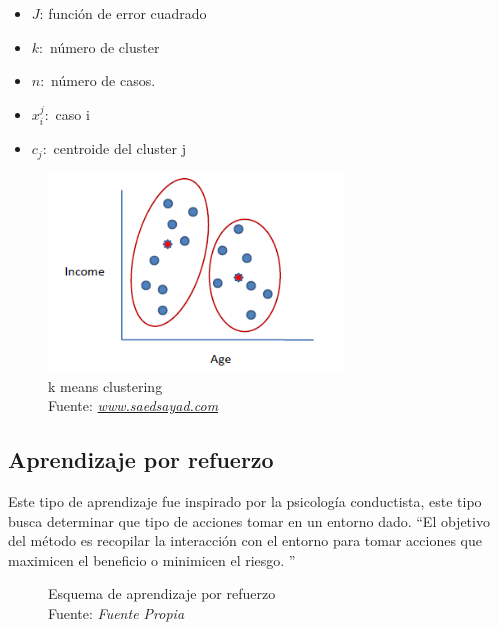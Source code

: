 \begin{itemize}
	\item $J$: función de error cuadrado
	\item $k:$ número de cluster
	\item $n:$ número de casos.
	\item $x_{i}^j:$ caso i
	\item $c_{j}:$ centroide del cluster j
\end{itemize}
\begin{figure}[H]
	\centering
	\includegraphics[width=0.7\textwidth]{Figures/kmeans.png}
	\caption{k means clustering\\ Fuente:  \href{http://www.saedsayad.com/clustering_kmeans.htm}{\textit{www.saedsayad.com}}}
	\label{kmeans}
\end{figure} 


\subsection{Aprendizaje por refuerzo}
Este tipo de aprendizaje fue inspirado por la psicología conductista, este tipo busca determinar que tipo de acciones tomar en un entorno dado. \textquotedblleft El objetivo del método es recopilar la interacción con el entorno para tomar acciones que maximicen el beneficio o minimicen el riesgo. \textquotedblright \cite{WEBSITE:1}

\begin{figure}[H]
\begin{center}
	
\end{center}
\caption{Esquema de aprendizaje por refuerzo \\ Fuente:  \textit{Fuente Propia}}
\label{refuerzo}
\end{figure}

